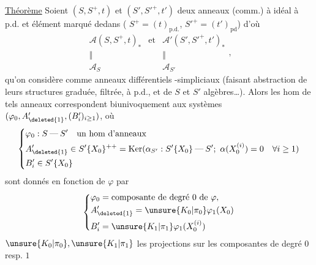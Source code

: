 \uline{Théorème} Soient $(S,S^+,t)$ et $(S',S'^+,t')$ deux anneaux (comm.) à idéal à p.d. et élément marqué dedans
(\uline{} $S^+=(t)_{\mathrm{p.d.}}$, $S'^+=(t')_{\mathrm{pd}}$)
d'où
\[
 \begin{array}{ccc}\mathcal A(S,S^+,t)_*&\text{et}&
 \mathcal A'(S',S'^+,t')_*\\
 \Vert&&\Vert\\
 \mathcal A_S&&\mathcal A_{S'}\end{array},
\]
qu'on considère comme anneaux différentiels -simpliciaux
(faisant abstraction de leurs structures graduée, filtrée, à p.d., et de $S$ et $S'$ algèbres\ldots).
Alors les hom \inserted{$\varphi$} de tels anneaux  correspondent biunivoquement aux systèmes $(\varphi_0,A'_{\deleted{1}},(B'_i)_{i\geq1})$, où
\[
 \left\{\begin{aligned}
 &\varphi_0:S\mathbin{\text{---}}S'\quad\text{un hom d'anneaux}\\
 &A'_{\deleted{1}}\in S'\{X_0\}^{++}=\operatorname{Ker}(\alpha_{S'}:S'\{X_0\}\mathbin{\text{---}}S';\ \alpha(X_0^{(i)})=0\quad\forall i\geq1)\\
 &B'_i\in S'\{X_0\}
 \end{aligned}\right.
\]
sont donnés en fonction de $\varphi$ par
\[
 \left\{\begin{aligned}
 &\varphi_0=\text{composante de degré }0\text{ de }\varphi,\\
 &A'_{\deleted{1}}=\unsure{K_0|\pi_0}\varphi_1(X_0)\\
 &B'_i=\unsure{K_1|\pi_1}\varphi_1(X_0^{(i)})
 \end{aligned}\right.
\]
$\unsure{K_0|\pi_0},\unsure{K_1|\pi_1}$ les projections sur les composantes de degré $0$ resp. $1$

